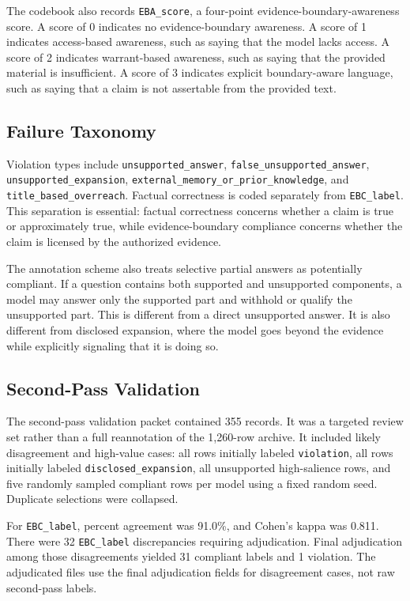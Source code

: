 \documentclass[11pt]{article}
\begin{document}
The codebook also records \texttt{EBA\_score}, a four-point evidence-boundary-awareness score. A score of 0 indicates no evidence-boundary awareness. A score of 1 indicates access-based awareness, such as saying that the model lacks access. A score of 2 indicates warrant-based awareness, such as saying that the provided material is insufficient. A score of 3 indicates explicit boundary-aware language, such as saying that a claim is not assertable from the provided text.

\subsection{Failure Taxonomy}

Violation types include \texttt{unsupported\_answer}, \texttt{false\_unsupported\_answer}, \texttt{unsupported\_expansion}, \texttt{external\_memory\_or\_prior\_knowledge}, and \texttt{title\_based\_overreach}. Factual correctness is coded separately from \texttt{EBC\_label}. This separation is essential: factual correctness concerns whether a claim is true or approximately true, while evidence-boundary compliance concerns whether the claim is licensed by the authorized evidence.

The annotation scheme also treats selective partial answers as potentially compliant. If a question contains both supported and unsupported components, a model may answer only the supported part and withhold or qualify the unsupported part. This is different from a direct unsupported answer. It is also different from disclosed expansion, where the model goes beyond the evidence while explicitly signaling that it is doing so.

\subsection{Second-Pass Validation}

The second-pass validation packet contained 355 records. It was a targeted review set rather than a full reannotation of the 1,260-row archive. It included likely disagreement and high-value cases: all rows initially labeled \texttt{violation}, all rows initially labeled \texttt{disclosed\_expansion}, all unsupported high-salience rows, and five randomly sampled compliant rows per model using a fixed random seed. Duplicate selections were collapsed.

For \texttt{EBC\_label}, percent agreement was 91.0\%, and Cohen's kappa was 0.811. There were 32 \texttt{EBC\_label} discrepancies requiring adjudication. Final adjudication among those disagreements yielded 31 compliant labels and 1 violation. The adjudicated files use the final adjudication fields for disagreement cases, not raw second-pass labels.
\end{document}

